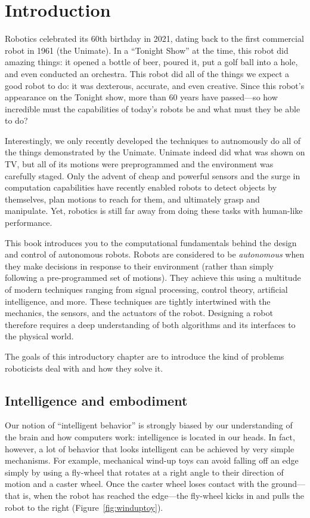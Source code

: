 \chapter{Introduction}\label{chap:introduction}
Robotics celebrated its 60th birthday in 2021, dating back to the first commercial robot in 1961 (the Unimate). In a ``Tonight Show'' at the time, this robot did amazing things: it opened a bottle of beer, poured it, put a golf ball into a hole, and even conducted an orchestra. This robot did all of the things we expect a good robot to do: it was dexterous, accurate, and even creative. Since this robot's appearance on the Tonight show, more than 60 years have passed---so how incredible must the capabilities of today's robots be and what must they be able to do?

Interestingly, we only recently developed the techniques to autnomously do all of the things demonstrated by the Unimate. Unimate indeed did what was shown on TV, but all of its motions were preprogrammed and the environment was carefully staged. Only the advent of cheap and powerful sensors and the surge in computation capabilities have recently enabled robots to detect objects by themselves, plan motions to reach for them, and ultimately grasp and manipulate. Yet, robotics is still far away from doing these tasks with human-like performance.

This book introduces you to the computational fundamentals behind the design and control of autonomous robots. Robots are considered to be \textsl{autonomous} when they make decisions in response to their environment (rather than simply following a pre-programmed set of motions). They achieve this using a multitude of modern techniques ranging from signal processing, control theory, artificial intelligence, and more. These techniques are tightly intertwined  with the mechanics, the sensors, and the actuators of the robot. Designing a robot therefore requires a deep understanding of both algorithms and its interfaces to the physical world.

The goals of this introductory chapter are to introduce the kind of problems roboticists deal with and how they solve it.

\section{Intelligence and embodiment}
Our notion of ``intelligent behavior'' is strongly biased by our understanding of the brain and how computers work: intelligence is located in our heads. In fact, however, a lot of behavior that looks intelligent can be achieved by very simple mechanisms. For example, mechanical wind-up toys can avoid falling off an edge simply by using a fly-wheel that rotates at a right angle to their direction of motion and a caster wheel. Once the caster wheel loses contact with the ground---that is, when the robot has reached the edge---the fly-wheel kicks in and pulls the robot to the right (Figure~\ref{fig:winduptoy}).

